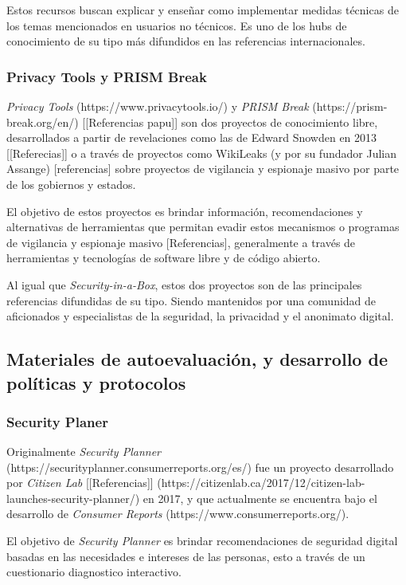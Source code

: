 \documentclass[12pt]{caltech_thesis}
\begin{document}
Estos recursos buscan explicar y enseñar como implementar medidas técnicas de los temas mencionados en usuarios no técnicos. Es uno de los hubs de conocimiento de su tipo más difundidos en las referencias internacionales.

\subsubsection{Privacy Tools y PRISM Break}

\textit{Privacy Tools} (https://www.privacytools.io/) y \textit{PRISM Break} (https://prism-break.org/en/) [[Referencias papu]] son dos proyectos de conocimiento libre, desarrollados a partir de revelaciones como las de Edward Snowden en 2013 [[Referecias]] o a través de proyectos como WikiLeaks (y por su fundador Julian Assange) [referencias] sobre proyectos de vigilancia y espionaje masivo por parte de los gobiernos y estados.

El objetivo de estos proyectos es brindar información, recomendaciones y alternativas de herramientas que permitan evadir estos mecanismos o programas de vigilancia y espionaje masivo [Referencias], generalmente a través de herramientas y tecnologías de software libre y de código abierto.

Al igual que \textit{Security-in-a-Box}, estos dos proyectos son de las principales referencias difundidas de su tipo. Siendo mantenidos por una comunidad de aficionados y especialistas de la seguridad, la privacidad y el anonimato digital.

\subsection{Materiales de autoevaluación, y desarrollo de políticas y protocolos}

\subsubsection{Security Planer}

Originalmente \textit{Security Planner} (https://securityplanner.consumerreports.org/es/) fue un proyecto desarrollado por \textit{Citizen Lab} [[Referencias]] (https://citizenlab.ca/2017/12/citizen-lab-launches-security-planner/) en 2017, y que actualmente se encuentra bajo el desarrollo de \textit{Consumer Reports} (https://www.consumerreports.org/).

El objetivo de \textit{Security Planner} es brindar recomendaciones de seguridad digital basadas en las necesidades e intereses de las personas, esto a través de un cuestionario diagnostico interactivo.
\end{document}
